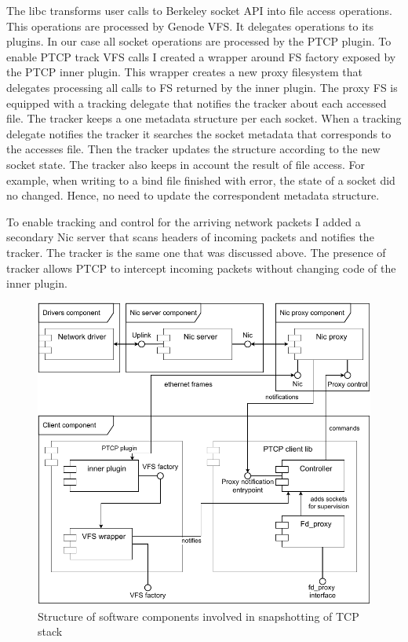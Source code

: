 The libc transforms user calls to Berkeley socket API into file access
operations. This operations are processed by Genode VFS. It delegates
operations to its plugins. In our case all socket operations are processed by
the PTCP plugin. To enable PTCP track VFS calls I created a wrapper around
FS factory exposed by the PTCP inner plugin. This wrapper creates a new
proxy filesystem that delegates processing all calls to FS returned by the
inner plugin. The proxy FS is equipped with a tracking delegate that notifies
the tracker about each accessed file. The tracker keeps a one metadata
structure per each socket. When a tracking delegate notifies the tracker it
searches the socket metadata that corresponds to the accesses file. Then the
tracker updates the structure according to the new socket state. The tracker 
also keeps in account the result of file access. For example, when writing to
a bind file finished with error, the state of a socket did no changed. Hence,
no need to update the correspondent metadata structure.

To enable tracking and control for the arriving network packets I added a
secondary Nic server that scans headers of incoming packets and notifies the
tracker. The tracker is the same one that was discussed above. The presence of
tracker allows PTCP to intercept incoming packets without changing code of the
inner plugin. 

\begin{figure}
    \centering
    \includegraphics[]{figs/tracking_tcp_stack.pdf}
    \caption{Structure of software components involved in snapshotting of TCP stack}
    \label{fig:track_components}
\end{figure}

